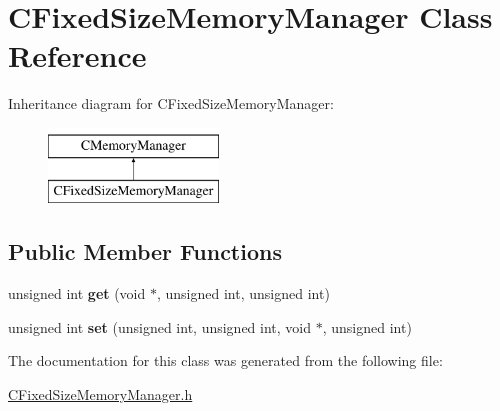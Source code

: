 \hypertarget{classCFixedSizeMemoryManager}{\section{\-C\-Fixed\-Size\-Memory\-Manager \-Class \-Reference}
\label{classCFixedSizeMemoryManager}
}
\-Inheritance diagram for \-C\-Fixed\-Size\-Memory\-Manager\-:\begin{figure}[H]
\begin{center}
\leavevmode
\includegraphics[height=2.000000cm]{classCFixedSizeMemoryManager}
\end{center}
\end{figure}
\subsection*{\-Public \-Member \-Functions}
\begin{DoxyCompactItemize}
\item 
\hypertarget{classCFixedSizeMemoryManager_aa3d4633079f042ab109105e0d110a4f1}{unsigned int {\bfseries get} (void $\ast$, unsigned int, unsigned int)}\label{classCFixedSizeMemoryManager_aa3d4633079f042ab109105e0d110a4f1}

\item 
\hypertarget{classCFixedSizeMemoryManager_a1aefa32d67f38a49124afa8b2d546332}{unsigned int {\bfseries set} (unsigned int, unsigned int, void $\ast$, unsigned int)}\label{classCFixedSizeMemoryManager_a1aefa32d67f38a49124afa8b2d546332}

\end{DoxyCompactItemize}


\-The documentation for this class was generated from the following file\-:\begin{DoxyCompactItemize}
\item 
\hyperlink{CFixedSizeMemoryManager_8h}{\-C\-Fixed\-Size\-Memory\-Manager.\-h}\end{DoxyCompactItemize}
